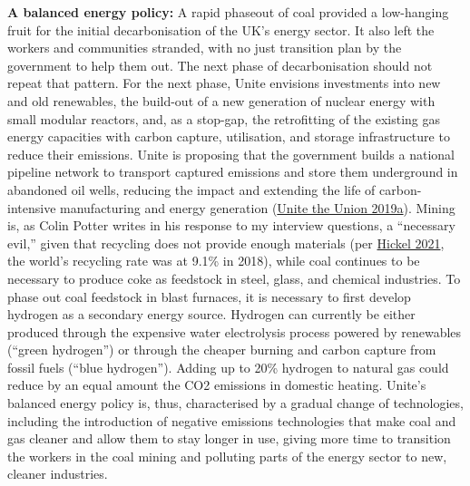 \documentclass[a4paper, nobind]{templates/ociamthesis}
\begin{document}
\textbf{A balanced energy policy:} A rapid phaseout of coal provided a low-hanging fruit for the initial decarbonisation of the UK's energy sector. It also left the workers and communities stranded, with no just transition plan by the government to help them out. The next phase of decarbonisation should not repeat that pattern. For the next phase, Unite envisions investments into new and old renewables, the build-out of a new generation of nuclear energy with small modular reactors, and, as a stop-gap, the retrofitting of the existing gas energy capacities with carbon capture, utilisation, and storage infrastructure to reduce their emissions. Unite is proposing that the government builds a national pipeline network to transport captured emissions and store them underground in abandoned oil wells, reducing the impact and extending the life of carbon-intensive manufacturing and energy generation (\protect\hyperlink{ref-unite_the_union_response_2019}{Unite the Union 2019a}). Mining is, as Colin Potter writes in his response to my interview questions, a ``necessary evil,'' given that recycling does not provide enough materials (per \protect\hyperlink{ref-hickel_less_2021}{Hickel 2021}, the world's recycling rate was at 9.1\% in 2018), while coal continues to be necessary to produce coke as feedstock in steel, glass, and chemical industries. To phase out coal feedstock in blast furnaces, it is necessary to first develop hydrogen as a secondary energy source. Hydrogen can currently be either produced through the expensive water electrolysis process powered by renewables (``green hydrogen'') or through the cheaper burning and carbon capture from fossil fuels (``blue hydrogen''). Adding up to 20\% hydrogen to natural gas could reduce by an equal amount the CO2 emissions in domestic heating. Unite's balanced energy policy is, thus, characterised by a gradual change of technologies, including the introduction of negative emissions technologies that make coal and gas cleaner and allow them to stay longer in use, giving more time to transition the workers in the coal mining and polluting parts of the energy sector to new, cleaner industries.
\end{document}
